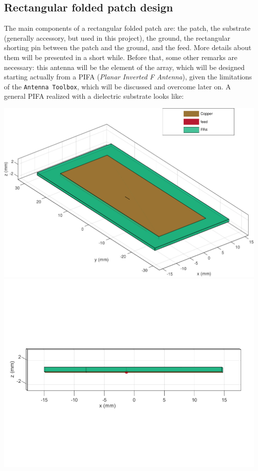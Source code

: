 \documentclass[12pt,a4paper]{article}
\begin{document}
{		\subsection*{\selectfont\color{Turquoise}Rectangular folded patch design}
		The main components of a rectangular folded patch are: the patch, the substrate (generally accessory, but used in this project), the ground, the rectangular shorting pin between the patch and the ground, and the feed. More details about them will be presented in a short while. Before that, some other remarks are necessary: this antenna will be the element of the array, which will be designed starting actually from a PIFA (\emph{Planar Inverted F Antenna}), given the limitations of the \texttt{\color{Mahogany}Antenna Toolbox}, which will be discussed and overcome later on. A general PIFA realized with a dielectric substrate looks like:
		\begin{center}
			\includegraphics[scale=0.35]{patch_structure.pdf}
			\includegraphics[scale=0.35]{patch_structure_2.pdf}

\end{center}}
\end{document}
